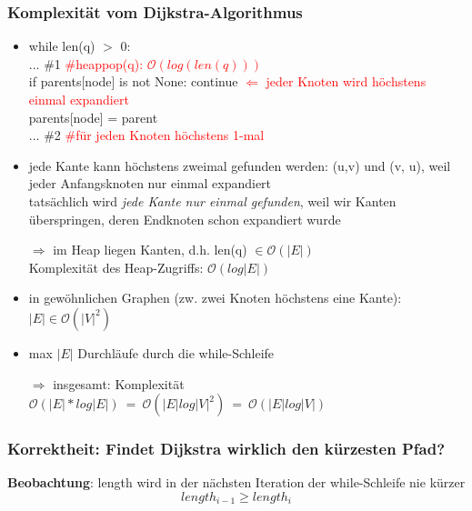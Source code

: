 \documentclass[11pt, fleqn]{scrreprt}
\newcommand{\bigO}[0]{\mathcal{O}}
\begin{document}
        \subsubsection*{Komplexität vom Dijkstra-Algorithmus}
        \begin{itemize}
        \item while len(q) $>$ 0: \\
        ... \#1 \hspace*{6cm} \textcolor{red}{\#heappop(q): $\bigO{}(log(len(q)))$}\\
        if parents[node] is not None: continue \textcolor{red}{$\Leftarrow$ jeder Knoten wird höchstens einmal expandiert}\\
        parents[node] = parent \\
        ... \#2\hspace*{6cm}  \textcolor{red}{\#für jeden Knoten höchstens 1-mal}
        \item jede Kante kann höchstens zweimal gefunden werden: (u,v) und (v, u), weil jeder Anfangsknoten nur einmal expandiert \\
        tatsächlich wird \emph{jede Kante nur einmal gefunden}, weil wir Kanten überspringen, deren Endknoten schon expandiert wurde
        \item[$\Rightarrow$] im Heap liegen Kanten, d.h. len(q) $\in \bigO{}(|E|)$ \\
        Komplexität des Heap-Zugriffs: \hspace*{0.5cm} $\bigO{}(log|E|)$
        \item in gewöhnlichen Graphen (zw. zwei Knoten höchstens eine Kante): \hspace*{0.5cm} $|E| \in \bigO{}(|V|^2)$
        \item max $|E|$ Durchläufe durch die while-Schleife
        \item[$\Rightarrow$] insgesamt: Komplexität \hspace*{0.5cm} $\bigO{}(|E| * log|E|) \ =\  \bigO{}(|E| log |V|^2) \ =\  \bigO{}(|E| log |V|)$
        \end{itemize}

        \subsubsection*{Korrektheit: Findet Dijkstra wirklich den kürzesten Pfad?}

        \textbf{Beobachtung}: length wird in der nächsten Iteration der while-Schleife nie kürzer
        \[ length_{i-1} \geq length_i\]
\end{document}
